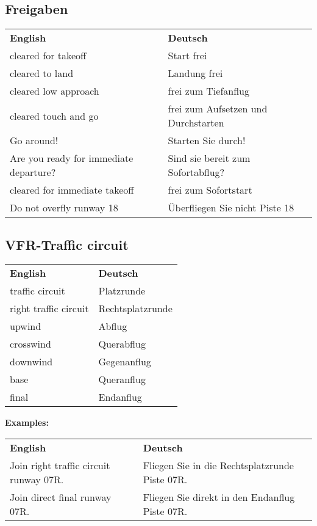 \subsection{Freigaben}
\begin{table}[H]
	\begin{tabularx}{\textwidth}{XX}
		\textbf{English} 					   & \textbf{Deutsch}     				 \\
		cleared for takeoff                    & Start frei                          \\ 
		cleared to land                        & Landung frei                        \\
		cleared low approach                   & frei zum Tiefanflug                 \\
		cleared touch and go                   & frei zum Aufsetzen und Durchstarten \\
		Go around!                             & Starten Sie durch!                  \\
		Are you ready for immediate departure? & Sind sie bereit zum Sofortabflug?   \\
		cleared for immediate takeoff          & frei zum Sofortstart                \\
		Do not overfly runway 18               & Überfliegen Sie nicht Piste 18     
	\end{tabularx}
\end{table}


\subsection{VFR-Traffic circuit}
\begin{table}[H]
	\begin{tabularx}{\textwidth}{XX}
		\textbf{English} 	  & \textbf{Deutsch} \\
		traffic circuit       & Platzrunde       \\
		right traffic circuit & Rechtsplatzrunde \\
		upwind                & Abflug           \\
		crosswind             & Querabflug       \\
		downwind              & Gegenanflug      \\
		base                  & Queranflug       \\
		final                 & Endanflug       
	\end{tabularx}
\end{table}
\textbf{Examples:}
\begin{table}[H]
	\begin{tabularx}{\textwidth}{XX}
		\textbf{English} 	  				   & \textbf{Deutsch} 								\\
		Join right traffic circuit runway 07R. & Fliegen Sie in die Rechtsplatzrunde Piste 07R. \\
		Join direct final runway 07R.          & Fliegen Sie direkt in den Endanflug Piste 07R.
	\end{tabularx}
\end{table}


